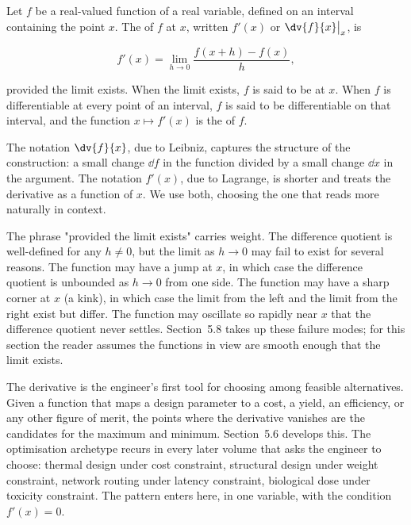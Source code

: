 \begin{definition}[Derivative]
Let $f$ be a real-valued function of a real variable, defined on
an interval containing the point $x$. The  of
$f$ at $x$, written $f'(x)$ or $\dv{f}{x}\big|_{x}$, is

\[
f'(x) = \lim_{h \to 0} \frac{f(x + h) - f(x)}{h},
\]

provided the limit exists. When the limit exists, $f$ is said to
be  at $x$. When $f$ is differentiable at
every point of an interval, $f$ is said to be differentiable on
that interval, and the function $x \mapsto f'(x)$ is the
 of $f$.
\end{definition}

The notation $\dv{f}{x}$, due to Leibniz, captures the structure of
the construction: a small change $\dd f$ in the function divided by
a small change $\dd x$ in the argument. The notation $f'(x)$, due
to Lagrange, is shorter and treats the derivative as a function of
$x$. We use both, choosing the one that reads more naturally in
context.

The phrase "provided the limit exists" carries weight. The
difference quotient is well-defined for any $h \neq 0$, but the
limit as $h \to 0$ may fail to exist for several reasons. The
function may have a jump at $x$, in which case the difference
quotient is unbounded as $h \to 0$ from one side. The function may
have a sharp corner at $x$ (a kink), in which case the limit from
the left and the limit from the right exist but differ. The
function may oscillate so rapidly near $x$ that the difference
quotient never settles. Section~5.8 takes up these failure modes;
for this section the reader assumes the functions in view are
smooth enough that the limit exists.

\begin{archetype}
The derivative is the engineer's first tool for choosing among
feasible alternatives. Given a function that maps a design
parameter to a cost, a yield, an efficiency, or any other figure
of merit, the points where the derivative vanishes are the
candidates for the maximum and minimum. Section~5.6 develops
this. The optimisation archetype recurs in every later volume
that asks the engineer to choose: thermal design under cost
constraint, structural design under weight constraint, network
routing under latency constraint, biological dose under toxicity
constraint. The pattern enters here, in one variable, with the
condition $f'(x) = 0$.
\end{archetype}

